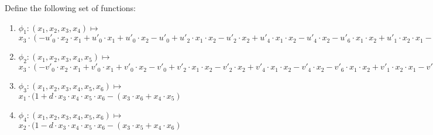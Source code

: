 Define the following set of functions:
\begin{enumerate}
	\item $\phi_1: (x_1, x_2, x_3, x_4) \mapsto $ \\
				$x_3 \cdot (-u'_0 \cdot x_2 \cdot x_1 + u'_0 \cdot x_1 + u'_0 \cdot x_2
				- u'_0 + u'_2 \cdot x_1 \cdot x_2 - u'_2\cdot x_2 + u'_4 \cdot x_1 \cdot x_2
				- u'_4\cdot x_2 -u'_6 \cdot x_1 \cdot x_2 + u'_1 \cdot x_2 \cdot x_1
				- u'_1 \cdot x_1 - u'_1 \cdot x_2 + u'_1  - u'_3 \cdot x_1 \cdot x_2 + u'_3\cdot x_2
				- u'_5 \cdot x_1 \cdot x_2 + u'_5\cdot x_2 + u'_7 \cdot x_1 \cdot x_2) -
				(x_4 - u'_0 \cdot x_2 \cdot x_1 + u'_0 \cdot x_1 + u'_0 \cdot x_2
				- u'_0 + u'_2 \cdot x_1 \cdot x_2 - u'_2\cdot x_2 + u'_4 \cdot x_1 \cdot x_2
				- u'_4\cdot x_2 -u'_6 \cdot x_1 \cdot x_2)$
	\item $\phi_2: (x_1, x_2, x_3, x_4, x_5) \mapsto $ \\
				$x_3 \cdot (-v'_0 \cdot x_2 \cdot x_1 + v'_0 \cdot x_1 + v'_0 \cdot x_2
				- v'_0 + v'_2 \cdot x_1 \cdot x_2 -v'_2 \cdot x_2 + v'_4 \cdot x_1 \cdot x_2
				- v'_4 \cdot x_2 - v'_6 \cdot x_1 \cdot x_2 + v'_1 \cdot x_2 \cdot x_1
				- v'_1 \cdot x_1 - v'_1 \cdot x_2 + v'_1  - v'_3 \cdot x_1 \cdot x_2
				+ v'_3 \cdot x_2 - v'_5 \cdot x_1 \cdot x_2 + v'_5 \cdot x_2
				+ v'_7 \cdot x_1 \cdot x_2) - (x_5 - v'_0 \cdot x_2 \cdot x_1
				+ v'_0 \cdot x_1 + v'_0 \cdot x_2 - v'_0 + v'_2 \cdot x_1 \cdot x_2
				- v'_2 \cdot x_2 + v'_4 \cdot x_1 \cdot x_2 - v'_4 \cdot x_2 - v'_6 \cdot x_1 \cdot x_2) $
	\item $\phi_3: (x_1, x_2, x_3, x_4, x_5, x_6) \mapsto $ \\
				$x_1 \cdot (1 + d \cdot x_3 \cdot x_4 \cdot x_5 \cdot x_6
				- (x_3 \cdot x_6 + x_4 \cdot x_5)$
	\item $\phi_4: (x_1, x_2, x_3, x_4, x_5, x_6) \mapsto $ \\
				$x_2 \cdot (1 - d \cdot x_3 \cdot x_4 \cdot x_5 \cdot x_6 - (x_3 \cdot x_5 + x_4 \cdot x_6)$
\end{enumerate}

